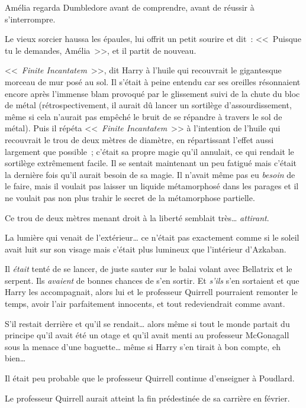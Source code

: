 Amélia regarda Dumbledore avant de comprendre, avant de réussir à s'interrompre.

Le vieux sorcier haussa les épaules, lui offrit un petit sourire et dit~: <<~Puisque tu le demandes, Amélia~>>, et il partit de nouveau.

\later

<<~\emph{Finite Incantatem}~>>, dit Harry à l'huile qui recouvrait le gigantesque morceau de mur posé au sol. Il s'était à peine entendu car ses oreilles résonnaient encore après l'immense blam provoqué par le glissement suivi de la chute du bloc de métal (rétrospectivement, il aurait dû lancer un sortilège d'assourdissement, même si cela n'aurait pas empêché le bruit de se répandre à travers le sol de métal). Puis il répéta <<~\emph{Finite Incantatem}~>> à l'intention de l'huile qui recouvrait le trou de deux mètres de diamètre, en répartissant l'effet aussi largement que possible~; c'était sa propre magie qu'il annulait, ce qui rendait le sortilège extrêmement facile. Il se sentait maintenant un peu fatigué mais c'était la dernière fois qu'il aurait besoin de sa magie. Il n'avait même pas eu \emph{besoin} de le faire, mais il voulait pas laisser un liquide métamorphosé dans les parages et il ne voulait pas non plus trahir le secret de la métamorphose partielle.

Ce trou de deux mètres menant droit à la liberté semblait très… \emph{attirant}.

La lumière qui venait de l'extérieur… ce n'était pas exactement comme si le soleil avait luit sur son visage mais c'était plus lumineux que l'intérieur d'Azkaban.

Il \emph{était} tenté de se lancer, de juste sauter sur le balai volant avec Bellatrix et le serpent. Ils \emph{avaient} de bonnes chances de s'en sortir. Et \emph{s'ils} s'en sortaient et que Harry les accompagnait, alors lui et le professeur Quirrell pourraient remonter le temps, avoir l'air parfaitement innocents, et tout redeviendrait comme avant.

S'il restait derrière et qu'il se rendait… alors même si tout le monde partait du principe qu'il avait été un otage et qu'il avait menti au professeur McGonagall sous la menace d'une baguette… même si Harry s'en tirait à bon compte, eh bien…

Il était peu probable que le professeur Quirrell continue d'enseigner à Poudlard.

Le professeur Quirrell aurait atteint la fin prédestinée de sa carrière en février.


